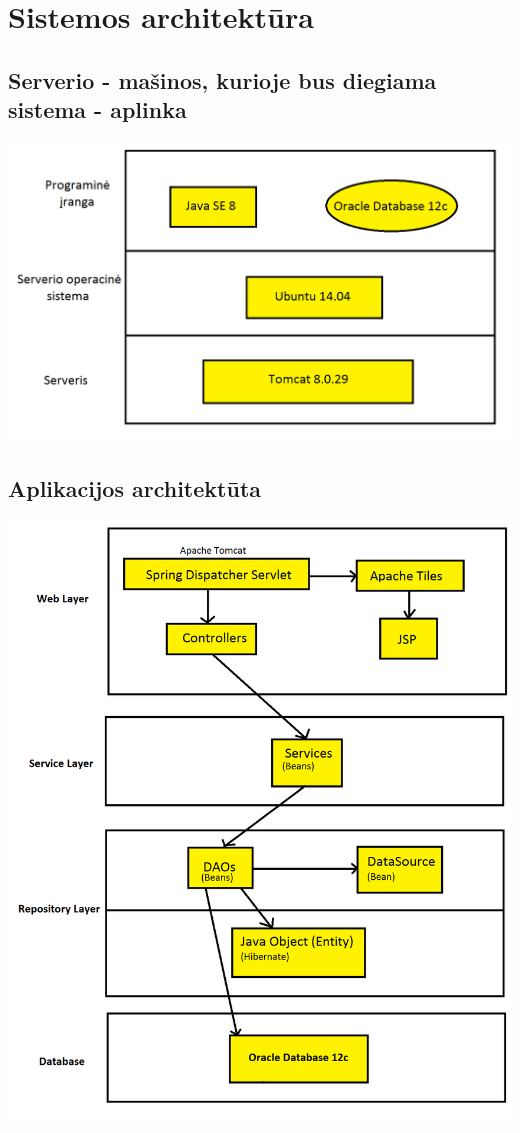 \documentclass[a4paper,12pt]{article}
\begin{document}
\section{Sistemos architektūra}
\subsection{Serverio - mašinos, kurioje bus diegiama sistema - aplinka}
\includegraphics[scale=0.5]{architektura1}
\subsection{Aplikacijos architektūta}
\includegraphics[scale=0.5]{architektura2}
\end{document}
